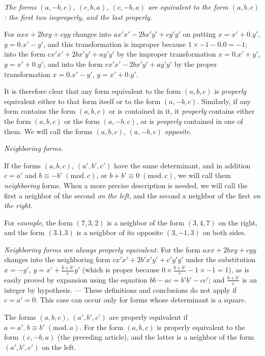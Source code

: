 \textit{The forms $(a,-b,c)$, $(c,b,a)$, $(c,-b,a)$ are equivalent to the form $(a,b,c)$: the first two improperly, and the last properly.}

For $axx+2bxy+cyy$ changes into $ax'x'-2bx'y'+cy'y'$ on putting $x=x'+0.y'$, $y=0.x'-y'$, and this transformation is improper because $1\times-1-0.0=-1$; into the form $cx'x'+2bx'y'+ay'y'$ by the improper transformation $x=0.x'+y'$, $y=x'+0.y'$; and into the form $cx'x'-2bx'y'+ay'y'$ by the proper transformation $x=0.x'-y'$, $y=x'+0.y'$.

It is therefore clear that any form equivalent to the form $(a,b,c)$ is \textit{properly} equivalent either to that form itself or to the form $(a,-b,c)$. Similarly, if any form contains the form $(a,b,c)$ or is contained in it, it \textit{properly} contains either the form $(a,b,c)$ or the form $(a,-b,c)$, or is \textit{properly} contained in one of them. We will call the forms $(a,b,c)$, $(a,-b,c)$ \textit{opposite}.

\begin{center}
\textit{Neighboring forms.}
\end{center}
If the forms $(a,b,c)$, $(a',b',c')$ have the same determinant, and in addition $c=a'$ and $b\equiv-b'\; (\mathrm{mod.}\,c)$, or $b+b'\equiv0\; (\mathrm{mod.}\,c)$, we will call them \textit{neighboring} forms. When a more precise description is needed, we will call the first a neighbor of the second \textit{on the left}, and the second a neighbor of the first \textit{on the right}.

For \textit{example}, the form $(7,3,2)$ is a neighbor of the form $(3,4,7)$ on the right, and the form $(3.1.3)$ is a neighbor of its opposite $(3,-1,3)$ on both sides.

\textit{Neighboring forms are always properly equivalent.} For the form $axx+2bxy+cyy$ changes into the neighboring form $cx'x'+2b'x'y'+c'y'y'$ under the substitution $x=-y'$, $y=x'+\frac{b+b'}{c}y'$ (which is proper because $0\times\frac{b+b'}{c}-1\times-1=1$), as is easily proved by expansion using the equation $bb-ac=b'b'-cc'$; and $\frac{b+b'}{c}$ is an integer by hypothesis. --- These definitions and conclusions do not apply if $c=a'=0$. This case can occur only for forms whose determinant is a square.

The forms $(a,b,c)$, $(a',b',c')$ are properly equivalent if $a=a'.\ b\equiv b'\; (\mathrm{mod.}\,a)$. For the form $(a,b,c)$ is properly equivalent to the form $(c,-b,a)$ (the preceding article), and the latter is a neighbor of the form $(a',b',c')$ on the left.


